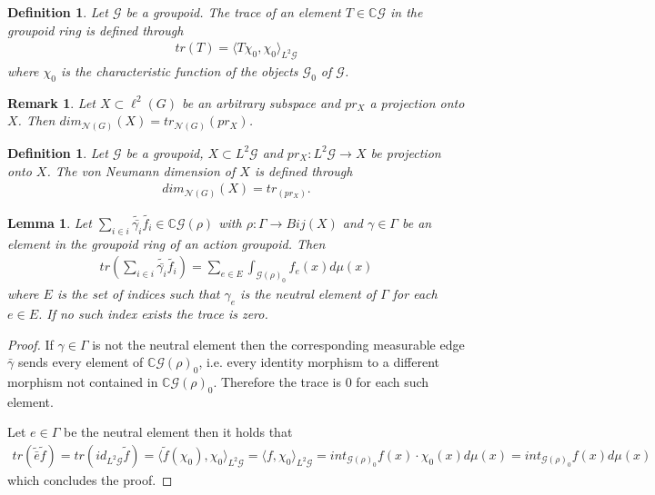 \documentclass[12pt,a4paper]{scrartcl}
\newtheorem{Definition}[Theorem]{Definition}
\newtheorem{Lemma}[Theorem]{Lemma}
\newtheorem{Remark}[Theorem]{Remark}
\numberwithin{equation}{section}
\newcommand{\C}{\mathbb{C}} %
\newcommand{\2}{\mathbb{Z} / 2 \mathbb{Z}}
\newcommand{\G}{\mathcal{G}}
\newcommand{\1}{\bar{1}}
\newcommand{\0}{\bar{0}}
\begin{document}
\begin{Definition}
	Let $\G$ be a groupoid. The trace of an element $T \in \C \G$ in the groupoid ring is defined through
	\begin{align*}
		tr(T) = \langle T \chi_0, \chi_0 \rangle_{L^2 \G}
	\end{align*}
	where $\chi_0$ is the characteristic function of the objects $\G_0$ of $\G$.
\end{Definition}
\begin{Remark}
	Let $X \subset \ell^2(G)$ be an arbitrary subspace and $pr_X$ a projection onto $X$. Then $dim_{\mathcal{N}(G)}(X) = tr_{\mathcal{N}(G)}(pr_X)$.
\end{Remark}
\begin{Definition}
	Let $\G$ be a groupoid, $X \subset L^2 \G$ and $pr_X: L^2 \G \to X$ be projection onto $X$. The von Neumann dimension of $X$ is defined through
	\begin{align*}
		dim_{\mathcal{N}(G)}(X) = tr_(pr_X).
	\end{align*}
\end{Definition}
\begin{Lemma} \label{trgroupoid}
	Let $\sum_{i \in i} \tilde{\bar{\gamma_i}} \tilde{f_i} \in \C\G(\rho)$ with $\rho: \Gamma \to Bij(X)$ and $\gamma \in \Gamma$ be an element in the groupoid ring of an action groupoid. Then
	\begin{align*}
		tr(\sum_{i \in i} \tilde{\bar{\gamma_i}} \tilde{f_i}) = \sum_{e \in E} \int_{\G(\rho)_0} f_e(x) d\mu(x)
	\end{align*}
	where $E$ is the set of indices such that $\gamma_e$ is the neutral element of $\Gamma$ for each $e \in E$. If no such index exists the trace is zero.
\end{Lemma}
\begin{proof} 
	If $\gamma \in \Gamma$ is not the neutral element then the corresponding measurable edge $\bar{\gamma}$ sends every element of $\C\G(\rho)_0$, i.e. every identity morphism to a different morphism not contained in $\C\G(\rho)_0$. Therefore the trace is $0$ for each such element.
	
	Let $e \in \Gamma$ be the neutral element then it holds that
	\begin{align*}
		tr(\tilde{\bar{e}} \tilde{f}) = tr(id_{L^2 \G} \tilde{f}) = \langle \tilde{f} (\chi_0), \chi_0 \rangle_{L^2 \G} = \langle f, \chi_0 \rangle_{L^2 \G} = int_{\G(\rho)_0} f(x) \cdot \chi_0(x) d\mu(x) = int_{\G(\rho)_0} f(x) d\mu(x)
	\end{align*}
	which concludes the proof.
\end{proof}
\end{document}
